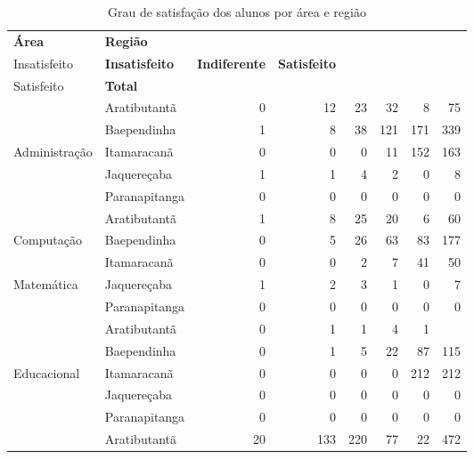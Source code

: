 \begin{table}[h]
\footnotesize
\centering
\caption{Grau de satisfação dos alunos por área e região}
\vspace{0.5em}
\label{tabela:q15}
\begin{tabular}{ll rrrrrr}
  \toprule
  \textbf{Área}        	& \textbf{Região} &  \textbf{\specialcell{c}{Muito\\Insatisfeito}} &  \textbf{Insatisfeito} &  \textbf{ Indiferente} &  \textbf{ Satisfeito} & \textbf{\specialcell{c}{Muito\\Satisfeito}} & \textbf{Total} \\
   \midrule
						& Aratibutantã    &   0 &  12 &  23 &  32 &   8 &  75\\ 
                          & Baependinha   &   1 &   8 &  38 & 121 & 171 & 339\\ 
   Administração          & Itamaracanã   &   0 &   0 &   0 &  11 & 152 & 163\\ 
                          & Jaquereçaba   &   1 &   1 &   4 &   2 &   0 &   8\\ 
                          & Paranapitanga &   0 &   0 &   0 &   0 &   0 &   0\\ 
\midrule
					& Aratibutantã        &   1 &   8 &  25 &  20 &   6 &  60\\ 
	Computação         	& Baependinha     &   0 &   5 &  26 &  63 &  83 & 177\\ 
	\specialcell{c}{e}  & Itamaracanã     &   0 &   0 &   2 &   7 &  41 &  50\\ 
	Matemática          & Jaquereçaba     &   1 &   2 &   3 &   1 &   0 &   7\\ 
                        & Paranapitanga   &   0 &   0 &   0 &   0 &   0 &   0\\ 
\midrule
					& Aratibutantã        &   0 &   1 &   1 &   4 &   1 &    \\ 
                          & Baependinha   &   0 &   1 &   5 &  22 &  87 & 115\\ 
  Educacional             & Itamaracanã   &   0 &   0 &   0 &   0 & 212 & 212\\ 
                          & Jaquereçaba   &   0 &   0 &   0 &   0 &   0 &   0\\ 
                          & Paranapitanga &   0 &   0 &   0 &   0 &   0 &   0\\ 
\midrule				& Aratibutantã    &  20 & 133 & 220 &  77 &  22 & 472\\ 

\end{tabular}
\end{table}
